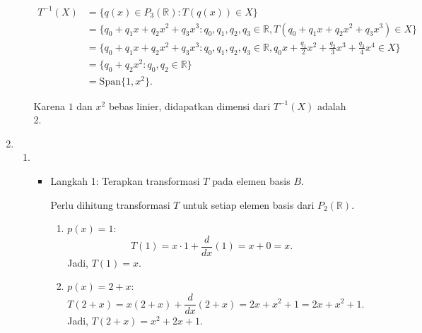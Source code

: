 \documentclass[11pt,letterpaper]{article}
\begin{document}
\begin{enumerate}
\begin{enumerate}
                \[
                  \begin{aligned}
                    T^{-1}(X)
                     & = \{q(x) \in P_3(\mathbb{R}) : T(q(x)) \in X \}                                                                                             \\
                     & = \{q_0 + q_1x + q_2x^2 + q_3x^3 : q_0, q_1, q_2, q_3 \in \mathbb{R}, T(q_0 + q_1x + q_2x^2 + q_3x^3) \in X\}                               \\
                     & = \{q_0 + q_1x + q_2x^2 + q_3x^3 : q_0, q_1, q_2, q_3 \in \mathbb{R}, q_0x + \frac{q_1}{2}x^2 + \frac{q_2}{3}x^3 + \frac{q_3}{4}x^4 \in X\} \\
                     & = \{q_0 + q_2x^2 : q_0, q_2 \in \mathbb{R}\}                                                                                                \\
                     & = \text{Span}\{1, x^2\}.
                  \end{aligned}
                \]

                Karena $1$ dan $x^2$ bebas linier, didapatkan dimensi dari $T^{-1}(X)$ adalah 2.
        \end{enumerate}
  \item
        \begin{enumerate}
          \item \begin{itemize}
                  \item Langkah 1: Terapkan transformasi $T$ pada elemen basis $B$.

                        Perlu dihitung transformasi $T$ untuk setiap elemen basis dari $P_2(\mathbb{R})$.

                        \begin{enumerate}
                          \item $p(x) = 1$:
                                \[
                                  T(1) = x \cdot 1 + \frac{d}{dx}(1) = x + 0 = x.
                                \]
                                Jadi, $T(1) = x$.

                          \item $p(x) = 2 + x$:
                                \[
                                  T(2+x) = x(2+x) + \frac{d}{dx}(2+x) = 2x + x^2 + 1 = 2x + x^2 + 1.
                                \]
                                Jadi, $T(2+x) = x^2 + 2x + 1$.


\end{enumerate}
\end{itemize}
\end{enumerate}
\end{enumerate}
\end{document}
